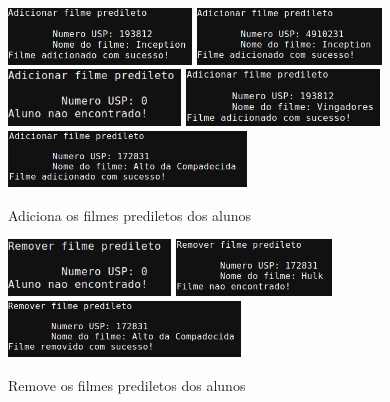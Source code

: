 \documentclass[12pt,a4paper,portuguese]{article}
\begin{document}
        \begin{figure}[H]
            \centering
            \includegraphics[height=1.5cm]{imgs/adiciona_filme_1.png}
            \includegraphics[height=1.5cm]{imgs/adiciona_filme_2.png}
            \includegraphics[height=1.5cm]{imgs/adiciona_filme_3.png}
            \includegraphics[height=1.5cm]{imgs/adiciona_filme_4.png}
            \includegraphics[height=1.5cm]{imgs/adiciona_filme_5.png}
            \caption{Adiciona os filmes prediletos dos alunos}
        \end{figure}

        \begin{figure}[H]
            \centering
            \includegraphics[height=1.5cm]{imgs/remove_filme_1.png}
            \includegraphics[height=1.5cm]{imgs/remove_filme_2.png}
            \includegraphics[height=1.5cm]{imgs/remove_filme_3.png}
            \caption{Remove os filmes prediletos dos alunos}
        \end{figure}
\end{document}
